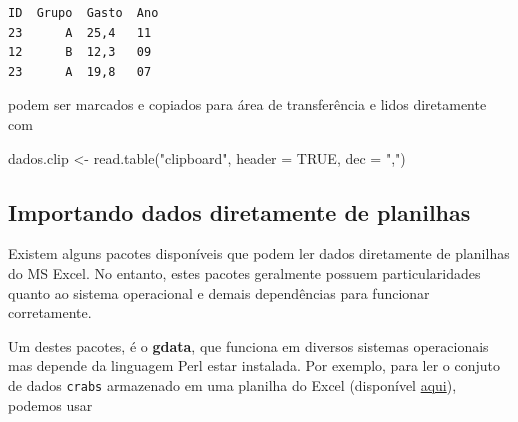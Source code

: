 \documentclass[
  10pt,
  a4paper]{book}
\newenvironment{Shaded}{\begin{snugshade}}{\end{snugshade}}
\newcommand{\AttributeTok}[1]{\textcolor[rgb]{0.77,0.63,0.00}{#1}}
\newcommand{\ConstantTok}[1]{\textcolor[rgb]{0.00,0.00,0.00}{#1}}
\newcommand{\DecValTok}[1]{\textcolor[rgb]{0.00,0.00,0.81}{#1}}
\newcommand{\ErrorTok}[1]{\textcolor[rgb]{0.64,0.00,0.00}{\textbf{#1}}}
\newcommand{\FloatTok}[1]{\textcolor[rgb]{0.00,0.00,0.81}{#1}}
\newcommand{\FunctionTok}[1]{\textcolor[rgb]{0.00,0.00,0.00}{#1}}
\newcommand{\NormalTok}[1]{#1}
\newcommand{\OtherTok}[1]{\textcolor[rgb]{0.56,0.35,0.01}{#1}}
\newcommand{\SpecialCharTok}[1]{\textcolor[rgb]{0.00,0.00,0.00}{#1}}
\newcommand{\StringTok}[1]{\textcolor[rgb]{0.31,0.60,0.02}{#1}}
\begin{document}
\begin{verbatim}
ID  Grupo  Gasto  Ano
23      A  25,4   11
12      B  12,3   09
23      A  19,8   07
\end{verbatim}

podem ser marcados e copiados para área de transferência e lidos
diretamente com

\begin{Shaded}
\begin{Highlighting}[]
\NormalTok{dados.clip }\OtherTok{\textless{}{-}} \FunctionTok{read.table}\NormalTok{(}\StringTok{"clipboard"}\NormalTok{, }\AttributeTok{header =} \ConstantTok{TRUE}\NormalTok{, }\AttributeTok{dec =} \StringTok{","}\NormalTok{)}
\end{Highlighting}
\end{Shaded}

\begin{Shaded}
\end{Shaded}

\hypertarget{importando-dados-diretamente-de-planilhas}{%
\subsection{Importando dados diretamente de planilhas}\label{importando-dados-diretamente-de-planilhas}}

Existem alguns pacotes disponíveis que podem ler dados diretamente de
planilhas do MS Excel. No entanto, estes pacotes geralmente possuem
particularidades quanto ao sistema operacional e demais dependências
para funcionar corretamente.

Um destes pacotes, é o \textbf{gdata}, que funciona em diversos sistemas
operacionais mas depende da linguagem Perl estar instalada. Por exemplo,
para ler o conjuto de dados \texttt{crabs} armazenado em uma planilha do Excel
(disponível \href{http://leg.ufpr.br/~fernandomayer/data/crabs.xls}{aqui}),
podemos usar
\end{document}
